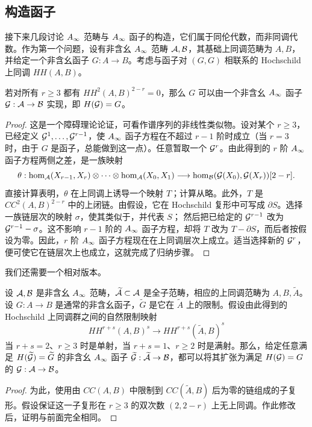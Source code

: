 \subsection{构造函子}\label{sec:1g}
接下来几段讨论 $A_\infty$ 范畴与 $A_\infty$ 函子的构造，它们属于同伦代数，而非同调代数。作为第一个问题，设有非含幺 $A_\infty$ 范畴 $\mathcal A,\mathcal B$，其基础上同调范畴为 $A,B$，并给定一个非含幺函子 $G:A\to B$。考虑与函子对 $(G,G)$ 相联系的 Hochschild 上同调 $HH(A,B)$。

\begin{lemma}\label{st:1.9}
若对所有 $r\ge3$ 都有 $HH^2(A,B)^{2-r}=0$，那么 $G$ 可以由一个非含幺 $A_\infty$ 函子 $\mathcal G:\mathcal A\to\mathcal B$ 实现，即 $H(\mathcal G)=G$。
\end{lemma}
\begin{proof}
这是一个障碍理论论证，可看作谱序列的非线性类似物。设对某个 $r\ge3$，已经定义 $\mathcal G^1,\ldots,\mathcal G^{r-1}$，使 $A_\infty$ 函子方程在不超过 $r-1$ 阶时成立（当 $r=3$ 时，由于 $G$ 是函子，总能做到这一点）。任意暂取一个 $\mathcal G^r$。由此得到的 $r$ 阶 $A_\infty$ 函子方程两侧之差，是一族映射
\begin{equation}\label{eq:1.14}
\theta:\hom_{\mathcal A}(X_{r-1},X_r)\otimes\cdots\otimes\hom_{\mathcal A}(X_0,X_1)\longrightarrow\hom_{\mathcal B}(\mathcal G(X_0),\mathcal G(X_r))[2-r].
\end{equation}
直接计算表明，$\theta$ 在上同调上诱导一个映射 $T$；计算从略。此外，$T$ 是 $CC^2(A,B)^{2-r}$ 中的上闭链。由假设，它在 Hochschild 复形中可写成 $\partial S$。选择一族链层次的映射 $\sigma$，使其类似于，并代表 $S$；
然后把已给定的 $\mathcal G^{r-1}$ 改为 $\mathcal G^{r-1}-\sigma$。这不影响 $r-1$ 阶的 $A_\infty$ 函子方程，却将 $T$ 改为 $T-\partial S$，而后者按假设为零。因此，$r$ 阶 $A_\infty$ 函子方程现在在上同调层次上成立。适当选择新的 $\mathcal G^r$，便可使它在链层次上也成立，这就完成了归纳步骤。
\end{proof}

我们还需要一个相对版本。
\begin{lemma}\label{st:1.10}
设 $\mathcal A,\mathcal B$ 是非含幺 $A_\infty$ 范畴，$\widetilde{\mathcal A}\subset\mathcal A$ 是全子范畴，相应的上同调范畴为 $A,B,\widetilde A$。设 $G:A\to B$ 是通常的非含幺函子，$\widetilde G$ 是它在 $\widetilde A$ 上的限制。假设由此得到的 Hochschild 上同调群之间的自然限制映射
\[
HH^{r+s}(A,B)^s\longrightarrow HH^{r+s}(\widetilde A,B)^s
\]
当 $r+s=2$、$r\ge3$ 时是单射，当 $r+s=1$、$r\ge2$ 时是满射。那么，给定任意满足 $H(\widetilde{\mathcal G})=\widetilde G$ 的非含幺 $A_\infty$ 函子 $\widetilde{\mathcal G}:\widetilde{\mathcal A}\to\mathcal B$，都可以将其扩张为满足 $H(\mathcal G)=G$ 的 $\mathcal G:\mathcal A\to\mathcal B$。
\end{lemma}
\begin{proof}
为此，使用由 $CC(A,B)$ 中限制到 $CC(\widetilde A,B)$ 后为零的链组成的子复形。假设保证这一子复形在 $r\ge3$ 的双次数 $(2,2-r)$ 上无上同调。作此修改后，证明与前面完全相同。
\end{proof}

